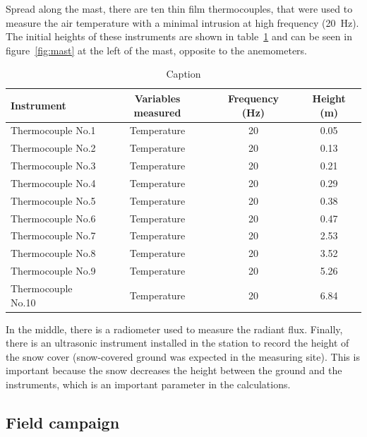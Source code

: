Spread along the mast, there are ten thin film thermocouples, that were used to measure the air temperature with a minimal intrusion at high frequency (20~Hz). The initial heights of these instruments are shown in table~\ref{tab:intruments_thermocouples} and can be seen in figure~\ref{fig:mast} at the left of the mast, opposite to the anemometers.

\begin{table}[!ht]
    \centering
    \begin{tabular}{ | l | c | c | c |}
    \hline
    \textbf{Instrument} & \textbf{Variables measured} & \textbf{Frequency (Hz)} & \textbf{Height (m)} \\ [0.5ex]  \hline\hline
    Thermocouple No.1 & Temperature & 20 &  0.05\\
    \hline
    Thermocouple No.2 & Temperature & 20 &  0.13\\
    \hline
    Thermocouple No.3 & Temperature & 20 &  0.21\\
    \hline
    Thermocouple No.4 & Temperature & 20 &  0.29\\
    \hline
    Thermocouple No.5 & Temperature & 20 &  0.38\\
    \hline
    Thermocouple No.6 & Temperature & 20 &  0.47\\
    \hline
    Thermocouple No.7 & Temperature & 20 &  2.53\\
    \hline
    Thermocouple No.8 & Temperature & 20 &  3.52\\
    \hline
    Thermocouple No.9 & Temperature & 20 &  5.26\\
    \hline
    Thermocouple No.10 & Temperature & 20 & 6.84 \\
    \hline
    
    \end{tabular}
    \caption{Caption}
    \label{tab:intruments_thermocouples}
\end{table}

In the middle, there is a radiometer used to measure the radiant flux. Finally, there is an ultrasonic instrument installed in the station to record the height of the snow cover (snow-covered ground was expected in the measuring site). This is important because the snow decreases the height between the ground and the instruments, which is an important parameter in the calculations.

\subsection{Field campaign}

